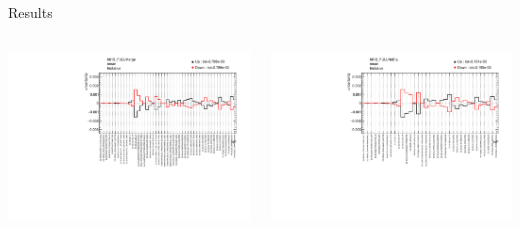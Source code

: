 \documentclass[bigger]{beamer}
\begin{document}
\begin{frame}[label={sec:org6c8e211}]{Results}
\begin{columns}
\begin{column}{0.45\columnwidth}
\begin{center}
\includegraphics[width=\linewidth]{./plots/h013_FULLMerge_Systematics_Inclusive_mean_mean.pdf}
\end{center}
\end{column}

\begin{column}{0.45\columnwidth}
\begin{center}
\includegraphics[width=\linewidth]{./plots/h013_FULLNoEta_Systematics_Inclusive_mean_mean.pdf}
\end{center}
\end{column}
\end{columns}
\end{frame}
\end{document}

